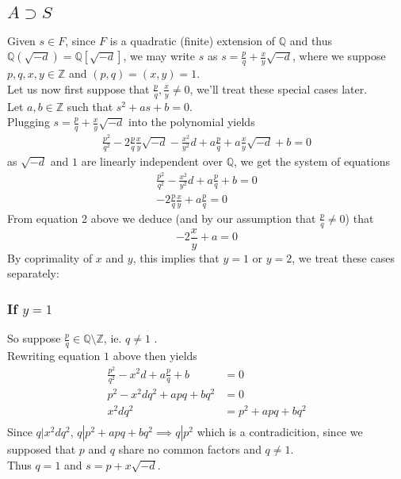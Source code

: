 \documentclass[11pt, a4paper]{article}
\begin{document}
\subsection*{ $ A \supset S$ }
Given $s \in F$, since $F$ is a quadratic (finite) extension of $\mathbb{Q}$ and thus $ \mathbb{Q}\left( \sqrt{-d} \right) = \mathbb{Q} \left[  \sqrt{-d} \right] $, we may write $s $ as $ s= \frac{p}{q} + \frac{x}{y}	 \sqrt{-d} $, where we suppose $ p,q,x,y \in \mathbb{Z}$ and $ ( p,q) = ( x,y) = 1$.\\
Let us now first suppose that $ \frac{p}{q}, \frac{x}{y}\neq 0$, we'll treat these special cases later.\\
Let $a,b \in \mathbb{Z}$ such that $ s^{2}+ as + b = 0$.\\
Plugging $s= \frac{p}{q}+ \frac{x}{y} \sqrt{-d} $ into the polynomial yields
\begin{align*}
\frac{p^{2}}{q^{2}} - 2 \frac{p}{q} \frac{x}{y} \sqrt{-d}  - \frac{x^{2}}{y^{2}}d + a \frac{p}{q} + a \frac{x}{y} \sqrt{-d} + b = 0
\end{align*}
as $ \sqrt{-d} $ and $1$ are linearly independent over $\mathbb{Q}$, we get the system of equations
\begin{align}
\frac{p^{2}}{q^{2}} - \frac{x^{2}}{y^{2}} d + a \frac{p}{q} + b =0\\
- 2 \frac{p}{q} \frac{x}{y} + a \frac{p}{q} = 0
\end{align}
From equation 2 above we deduce (and by our assumption that $\frac{p}{q} \neq 0$) that
\[ 
-2 \frac{x}{y} + a =0
\]
By coprimality of $x$ and $y$, this implies that $ y =1$ or $y=2$, we treat these cases separately:
\subsubsection*{If $y=1$ }
So suppose $ \frac{p}{q}\in \mathbb{Q}\setminus \mathbb{Z}$, ie. $q \neq 1$ .\\
Rewriting equation $1$ above then yields
\begin{align*}
	\frac{p^{2}}{q^{2}} - x^{2} d + a \frac{p}{q} + b &=0\\
	p^{2} - x^{2} d q^{2} + a p q + b q ^{2} &=0\\
	x^{2}d q^{2} &= p^{2} + a pq + bq^{2}\\
\end{align*}
Since $q| x^{2}dq^{2}$, $ q | p^{2} + apq + bq^{2}\implies q | p^{2} $ which is a contradicition, since we supposed that $p$ and $q$ share no common factors and $q\neq 1$.\\
Thus $q=1$ and $ s = p + x \sqrt{ -d} $.
\end{document}
